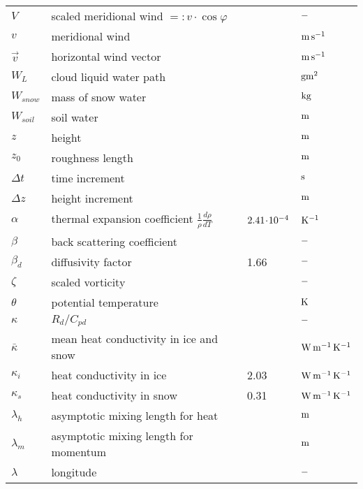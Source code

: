 \begin{tabular*}{\textwidth}{|l@{\extracolsep\fill}lll|}
$V$       & scaled meridional wind $=:v\cdot\cos\varphi$    &         & $\rm -$ \\
$v$       & meridional wind                  &         & $\rm m\, s^{-1}$
\\
$\vec{v}$      & horizontal wind vector                &         & $\rm m\, s^{-1}$
\\
$W_L$     & cloud liquid water path     &    & $\rm g m^2$ \\
$W_{snow}$ & mass of snow water    &    & $\rm kg $\\
$W_{soil}$     & soil water             &    & $\rm  m $\\
$z$       & height                      &    & $\rm m$ \\
$z_0$          & roughness length            &    & $\rm m$ \\
$\Delta t $    & time increment              &    & $\rm s$ \\
 $\Delta z $   & height increment            &    &$\rm  m$ \\
$\alpha$  & thermal expansion coefficient $\frac{1}{\rho} \frac{d\rho}{dT}$ & $\rm
2.41\! \cdot \! 10^{-4}$ & $\rm K^{-1}$ \\
$\beta$   & back scattering coefficient &         &$\rm - $\\
$\beta_d$      & diffusivity factor          & 1.66    &$\rm - $ \\
$\zeta$   & scaled vorticity                      &         & $\rm -$ \\
$\theta$  & potential temperature            &         & $\rm K$ \\
$\kappa$  & $R_d/C_{pd}$                               &         & $\rm -$ \\
$\bar{\kappa}$      & mean heat conductivity in ice and snow     &         & $\rm W\,
m^{-1}\, K^{-1}$ \\
$\kappa_i$     & heat conductivity in ice              &  2.03   & $\rm W\, m^{-1}\,
K^{-1}$ \\
$\kappa_s$     & heat conductivity in snow             &  0.31   & $\rm W\,
m^{-1}\, K^{-1}$ \\

$\lambda_h$    & asymptotic mixing length for heat     &    &$\rm m $\\
$\lambda_m$    & asymptotic mixing length for momentum      &    &$\rm m $\\

$\lambda$      & longitude                                  &         & $\rm -$ \\


\end{tabular*}

